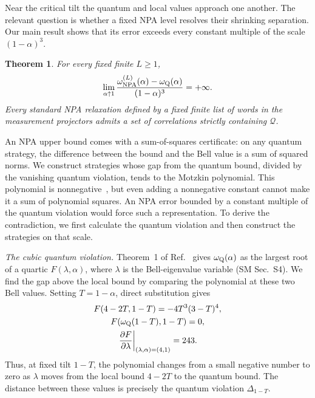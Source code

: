 \documentclass[aps,prl,twocolumn,10pt,superscriptaddress,nofootinbib,longbibliography,nobalancelastpage]{revtex4-2}
\newtheorem{theorem}{Theorem}
\newcommand{\Q}{\mathcal Q}
\begin{document}
Near the critical tilt the quantum and local values approach one another. The relevant question is whether a fixed NPA level resolves their shrinking separation. Our main result shows that its error exceeds every constant multiple of the scale $(1-\alpha)^3$.
\begin{theorem}\label{thm:main}
For every fixed finite $L\geq1$,
\begin{equation}
\lim_{\alpha\uparrow1}\frac{\omega_{\rm NPA}^{(L)}(\alpha)-\omega_{\rm Q}(\alpha)}{(1-\alpha)^3}=+\infty.
\label{eq:divergence}
\end{equation}
Every standard NPA relaxation defined by a fixed finite list of words in the measurement projectors admits a set of correlations strictly containing $\Q$.
\end{theorem}

An NPA upper bound comes with a sum-of-squares certificate: on any quantum strategy, the difference between the bound and the Bell value is a sum of squared norms. We construct strategies whose gap from the quantum bound, divided by the vanishing quantum violation, tends to the Motzkin polynomial. This polynomial is nonnegative~\cite{Motzkin1967}, but even adding a nonnegative constant cannot make it a sum of polynomial squares. An NPA error bounded by a constant multiple of the quantum violation would force such a representation. To derive the contradiction, we first calculate the quantum violation and then construct the strategies on that scale.

\emph{The cubic quantum violation.} Theorem~1 of Ref.~\cite{GigenaEtAl2025} gives $\omega_{\rm Q}(\alpha)$ as the largest root of a quartic $F(\lambda,\alpha)$, where $\lambda$ is the Bell-eigenvalue variable (SM Sec.~S4). We find the gap above the local bound by comparing the polynomial at these two Bell values. Setting $T=1-\alpha$, direct substitution gives
\[
\begin{gathered}
F(4-2T,1-T)=-4T^3(3-T)^4,\\
F(\omega_{\rm Q}(1-T),1-T)=0,\\
\left.\frac{\partial F}{\partial\lambda}\right|_{(\lambda,\alpha)=(4,1)}=243.
\end{gathered}
\]
Thus, at fixed tilt $1-T$, the polynomial changes from a small negative number to zero as $\lambda$ moves from the local bound $4-2T$ to the quantum bound. The distance between these values is precisely the quantum violation $\Delta_{1-T}$.
\end{document}
